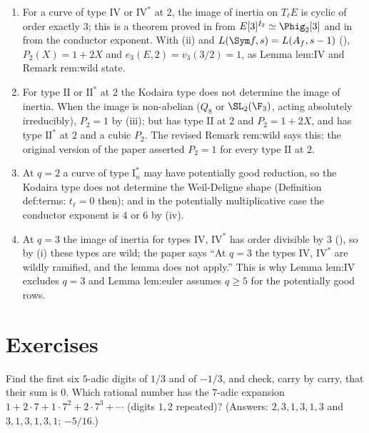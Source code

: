 \begin{remark}\label{rem:local:wild-paper}
\begin{enumerate}[label=(\alph*)]
\item For a curve of type $\mathrm{IV}$ or $\mathrm{IV}^*$ at $2$, the image of inertia on $T_\ell E$ is cyclic of order exactly $3$; this is a theorem proved in
 from $E[3]^{I_2}\simeq\Phig_2[3]$ and in  from the conductor exponent. With
(ii) and $L(\Sym f,s)=L(A_f,s-1)$ (), $P_2(X)=1+2X$ and $e_3(E,2)=v_3(3/2)=1$, as Lemma lem:IV and
Remark rem:wild state.
\item For type $\mathrm{II}$ or $\mathrm{II}^*$ at $2$ the Kodaira type does not determine the image of inertia. When the image is non-abelian ($Q_8$ or $\SL_2(\F_3)$,
acting absolutely irreducibly), $P_2=1$ by (iii); but  has type $\mathrm{II}$ at $2$ and $P_2=1+2X$, and  has type
$\mathrm{II}^*$ at $2$ and a cubic $P_2$. The revised Remark rem:wild says this; the original version of the paper asserted $P_2=1$ for every type $\mathrm{II}$ at $2$.
\item At $q=2$ a curve of type $\mathrm{I}_n^*$ may have potentially good reduction, so the Kodaira type does not determine the Weil-Deligne shape (Definition
def:terms: $t_\ell=0$ then); and in the potentially multiplicative case the conductor exponent is $4$ or $6$ by (iv).
\item At $q=3$ the image of inertia for types $\mathrm{IV}$, $\mathrm{IV}^*$ has order divisible by $3$ (), so by (i) these types
are wild; the paper says ``At $q=3$ the types $\mathrm{IV}$, $\mathrm{IV}^*$ are wildly ramified, and the lemma does not apply.'' This is why Lemma lem:IV excludes $q=3$ and Lemma lem:euler assumes $q\ge5$ for the potentially good
rows.
\end{enumerate}
\end{remark}

\section{Exercises}\label{sec:local:exercises}

\begin{exercise}\label{ex:local:ex-expansions}
Find the first six $5$-adic digits of $1/3$ and of $-1/3$, and check, carry by carry, that their sum is $0$. Which rational number has the $7$-adic
expansion $1+2\cdot7+1\cdot7^2+2\cdot7^3+\cdots$ (digits $1,2$ repeated)? (Answers: $2,3,1,3,1,3$ and $3,1,3,1,3,1$; $-5/16$.)
\end{exercise}


